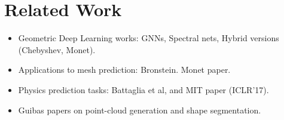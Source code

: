 \section{Related Work}

\begin{itemize}
\item Geometric Deep Learning works: GNNs, Spectral nets, Hybrid versions (Chebyshev, Monet). 

\item Applications to mesh prediction: Bronstein. Monet paper. 

\item Physics prediction tasks: Battaglia et al, and MIT paper (ICLR'17). 

\item Guibas papers on point-cloud generation and shape segmentation. 

\end{itemize}

